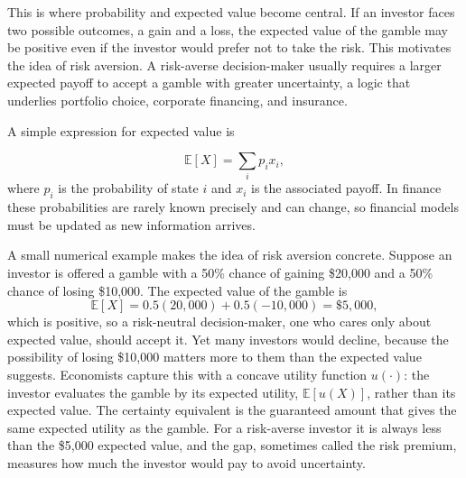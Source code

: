 \documentclass[../ai_in_finance]{subfiles}
\begin{document}
This is where probability and expected value become central. If an investor faces two possible outcomes, a gain and a loss, the expected value of the gamble may be positive even if the investor would prefer not to take the risk. This motivates the idea of risk aversion. A risk-averse decision-maker usually requires a larger expected payoff to accept a gamble with greater uncertainty, a logic that underlies portfolio choice, corporate financing, and insurance.

A simple expression for expected value is

\begin{equation}
\mathbb{E}[X] = \sum_i p_i x_i,\label{eq:intro-expected-value}
\end{equation}
where $p_i$ is the probability of state $i$ and $x_i$ is the associated payoff. In finance these probabilities are rarely known precisely and can change, so financial models must be updated as new information arrives.

A small numerical example makes the idea of risk aversion concrete. Suppose an investor is offered a gamble with a 50\% chance of gaining \$20,000 and a 50\% chance of losing \$10,000. The expected value of the gamble is
\begin{equation*}
\mathbb{E}[X] = 0.5(20{,}000) + 0.5(-10{,}000) = \$5{,}000,
\end{equation*}
which is positive, so a risk-neutral decision-maker, one who cares only about expected value, should accept it. Yet many investors would decline, because the possibility of losing \$10,000 matters more to them than the expected value suggests. Economists capture this with a concave utility function $u(\cdot)$: the investor evaluates the gamble by its expected utility, $\mathbb{E}[u(X)]$, rather than its expected value. The certainty equivalent is the guaranteed amount that gives the same expected utility as the gamble. For a risk-averse investor it is always less than the \$5,000 expected value, and the gap, sometimes called the risk premium, measures how much the investor would pay to avoid uncertainty.
\end{document}
